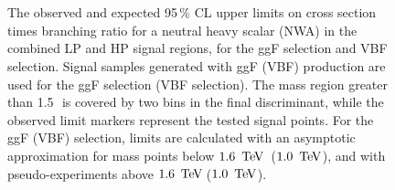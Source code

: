 \begin{figure}[H]
\centering
{}\\
\\
\caption[Observed and expected upper limits for narrow, heavy Higgs model (gluon-gluon fusion and vector boson fusion selection)]{The observed and expected 95\,\% CL upper limits on cross section times branching ratio for a neutral heavy scalar (NWA) in the combined LP and HP signal regions, for the \protect{} ggF selection and \protect{} VBF selection. Signal samples generated with ggF (VBF) production are used for the ggF selection (VBF selection). The mass region greater than 1.5\,\TeV\, is covered by two bins in the final discriminant, while the observed limit markers represent the tested signal points. For the ggF (VBF) selection, limits are calculated with an asymptotic approximation for mass points below $1.6\,\TeV$\, ($1.0\,\TeV$), and with pseudo-experiments above $1.6\,\TeV$\,($1.0\,\TeV$).}
\label{fig:lim_scalar}
\end{figure}


